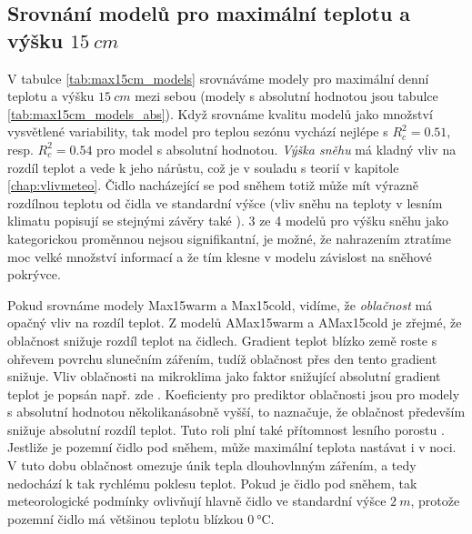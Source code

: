 \subsection{Srovnání modelů pro maximální teplotu a výšku $\SI{15}{cm}$}
V tabulce \ref{tab:max15cm_models} srovnáváme modely pro maximální denní teplotu a výšku $\SI{15}{cm}$ mezi sebou (modely s absolutní hodnotou jsou tabulce \ref{tab:max15cm_models_abs}). Když srovnáme kvalitu modelů jako množství vysvětlené variability, tak model pro teplou sezónu vychází nejlépe s $R_c^2 = 0.51$, resp. $R_c^2 = 0.54$ pro model s absolutní hodnotou. \textit{Výška sněhu} má kladný vliv na rozdíl teplot a vede k jeho nárůstu, což je v souladu s teorií v kapitole \ref{chap:vlivmeteo}. Čidlo nacházející se pod sněhem totiž může mít výrazně rozdílnou teplotu od čidla ve standardní výšce (vliv sněhu na teploty v lesním klimatu popisují se stejnými závěry také \cite{snow_deFrenneForestMicroclimates}). 3 ze 4 modelů pro výšku sněhu jako kategorickou proměnnou nejsou signifikantní, je možné, že nahrazením ztratíme moc velké množství informací a že tím klesne v modelu závislost na sněhové pokrývce.

Pokud srovnáme modely Max15warm a Max15cold, vidíme, že \textit{oblačnost} má opačný vliv na rozdíl teplot. Z modelů AMax15warm a AMax15cold je zřejmé, že oblačnost snižuje rozdíl teplot na čidlech. Gradient teplot blízko země roste s ohřevem povrchu slunečním zářením, tudíž oblačnost přes den tento gradient snižuje. Vliv oblačnosti na mikroklima jako faktor snižující absolutní gradient teplot je popsán např. zde \cite{snow_deFrenneForestMicroclimates, cloud_overwinteringclusters}. Koeficienty pro prediktor oblačnosti jsou pro modely s absolutní hodnotou několikanásobně vyšší, to naznačuje, že oblačnost především snižuje absolutní rozdíl teplot. Tuto roli plní také přítomnost lesního porostu \parencite{ZellwegerFlorian2019Sdou}. Jestliže je pozemní čidlo pod sněhem, může maximální teplota nastávat i v noci. V tuto dobu oblačnost omezuje únik tepla dlouhovlnným zářením, a tedy nedochází k tak rychlému poklesu teplot. Pokud je čidlo pod sněhem, tak meteorologické podmínky ovlivňují hlavně čidlo ve standardní výšce $\SI{2}{m}$, protože pozemní čidlo má většinou teplotu blízkou $\SI{0}{\celsius}$.

